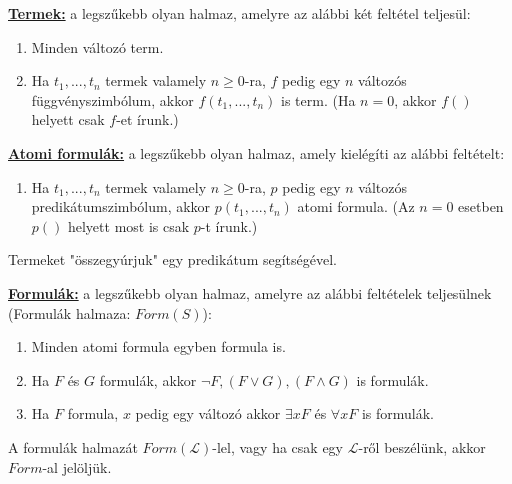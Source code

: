 \documentclass{beamer}
\newcommand{\mmedskip}{\vspace{0.5em}}
\begin{document}
\begin{frame}
\begin{tcolorbox}[title={Az $\mathcal{L}$ elsőrendű nyelv formulái}]
\underline{\textbf{Termek:}} a legszűkebb olyan halmaz, amelyre az alábbi két feltétel teljesül:\\
\begin{enumerate}
\item Minden változó term.
\item Ha $t_1, ..., t_n$ termek valamely $n \geq 0$-ra, $f$ pedig egy $n$ változós függvényszimbólum,
akkor $f(t_1, ..., t_n)$ is term. (Ha $n = 0$, akkor $f()$ helyett csak $f$-et írunk.)
\end{enumerate}
\mmedskip

\underline{\textbf{Atomi formulák:}} a legszűkebb olyan halmaz, amely kielégíti az alábbi feltételt:\\
\begin{enumerate}
\item Ha $t_1, ..., t_n$ termek valamely $n \geq 0$-ra, $p$ pedig egy $n$ változós predikátumszimbólum, akkor $p(t_1, ..., t_n)$ atomi formula. (Az $n = 0$ esetben $p()$ helyett most is csak $p$-t írunk.)
\end{enumerate}
{\small Termeket "összegyúrjuk" egy predikátum segítségével.}\\
\mmedskip

\underline{\textbf{Formulák:}} a legszűkebb olyan halmaz, amelyre az alábbi feltételek teljesülnek (Formulák halmaza: $Form(S)$):\\
\begin{enumerate}
\item Minden atomi formula egyben formula is.
\item Ha $F$ és $G$ formulák, akkor ${\neg}F, (F \lor G), (F \land G)$ is formulák.
\item Ha $F$ formula, $x$ pedig egy változó akkor ${\exists}xF$ és ${\forall}xF$ is formulák.
\end{enumerate}
\mmedskip

A formulák halmazát $Form(\mathcal{L})$-lel, vagy ha csak egy $\mathcal{L}$-ről beszélünk, akkor $Form$-al jelöljük.
\end{tcolorbox}

\end{frame}
\end{document}
